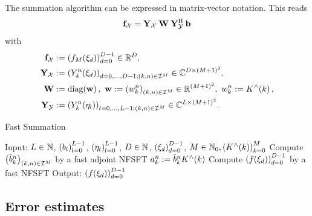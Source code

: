 \begin{remark}
	The summation algorithm can be expressed in matrix-vector notation. This reads
	\[
	  \mathbf{f}_{\mathcal{X}} = \mathbf{Y}_{\mathcal{X}} \: \mathbf{W} \:
	  \mathbf{Y}_{\mathcal{Y}}^{\text{\rm{H}}} \: \mathbf{b}
	\]
	with
	\begin{align}
	  \nonumber
	  \mathbf{f}_{\mathcal{X}} & := \left(f_{M}{\hspace{-0.4ex}}\left(\mathbf{\xi}_{d}\right)\right)_{d=0}^{D-1} \in \mathbb{R}^D,\\
	  \nonumber
	  \mathbf{Y}_{\mathcal{X}} & := \left(Y_k^n{\hspace{-0.4ex}}\left(\mathbf{\xi}_{d}\right)\right)_{d=0,\ldots,D-1; 
	  \left(k,n\right) \in \mathcal{I}^M} \in \mathbb{C}^{D \times \left(M+1\right)^2}, \\
	  \nonumber
	  \mathbf{W} & := \text{\rm{diag}}{\hspace{-0.4ex}}\left(\mathbf{w}\right),\ \mathbf{w} := \left(w_{k}^n\right)_{\left(k,n\right) \in 
	  \mathcal{I}^M} \in \mathbb{R}^{(M+1)^2},\ w_{k}^n := K^{\wedge}{\hspace{-0.4ex}}\left(k\right), \\
	  \nonumber
	  \mathbf{Y}_{\mathcal{Y}} & := \left(Y_k^n{\hspace{-0.4ex}}\left(\mathbf{\eta}_{l}\right)\right)_{l=0,\ldots,L-1;
	  \left(k,n\right) \in \mathcal{I}^M} \in \mathbb{C}^{L \times \left(M+1\right)^2}.
	\end{align}
\end{remark}

\begin{algorithm}[tb]
  \caption{Fast Summation}
  \label{Applications:Algorithm:FastSummation}    
  \begin{algorithmic}
    \STATE  Input:  $L \in \mathbb{N}$, $\left(b_{l}\right)_{l=0}^{L-1}$, 
    $\left(\mathbf{\eta}_{l}\right)_{l=0}^{L-1}$, $D \in \mathbb{N}$, 
    $\left(\mathbf{\xi}_{d}\right)_{d=0}^{D-1}$, $M \in \mathbb{N}_{0}, 
    \left(K^{\wedge}{\hspace{-0.4ex}}\left(k\right)\right)_{k=0}^M$
    \STATE
    \STATE Compute $\left(\tilde{b}_{k}^n\right)_{\left(k,n\right) \in \mathcal{I}^M}$ 
    by a fast adjoint NFSFT
    \STATE 
        \STATE $a_{k}^n := \tilde{b}_{k}^n K^{\wedge}{\hspace{-0.4ex}}\left(k\right)$
      \ENDFOR
    \ENDFOR
    \STATE
    \STATE Compute $\left(f{\hspace{-0.4ex}}\left(\mathbf{\xi}_{d}\right)\right)_{d=0}^{D-1}$ by a fast NFSFT
    \STATE
    \STATE Output: $\left(f{\hspace{-0.4ex}}\left(\mathbf{\xi}_{d}\right)\right)_{d=0}^{D-1}$
\end{algorithmic}
\end{algorithm}

\subsection{Error estimates}

